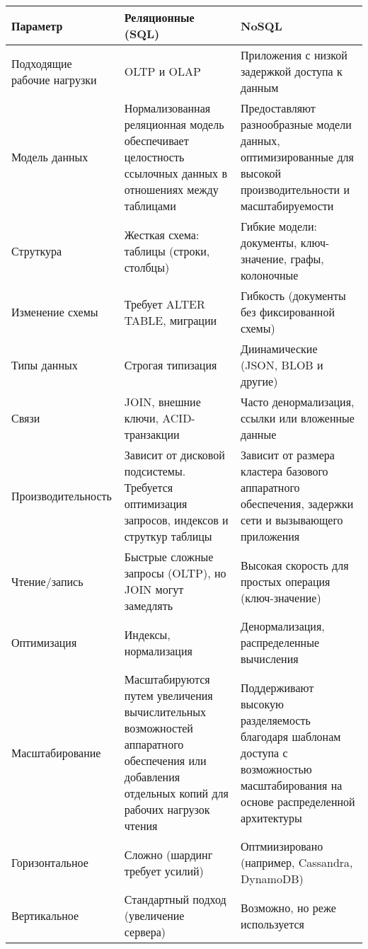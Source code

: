 \documentclass[12pt]{article}
\begin{document}
\begin{center}
    \begin{tabular}{|m{7.5em}|m{16em}|m{16em}|}
        \hline
        Параметр & Реляционные (SQL) & NoSQL \\
        \hline
        Подходящие рабочие нагрузки & OLTP и OLAP & Приложения с низкой задержкой доступа к данным \\
        \hline
        Модель данных & Нормализованная реляционная модель обеспечивает целостность ссылочных данных в отношениях между таблицами & Предоставляют разнообразные модели данных, оптимизированные для высокой производительности и масштабируемости \\ 
        \hline
        Струткура & Жесткая схема: таблицы (строки, столбцы) & Гибкие модели: документы, ключ-значение, графы, колоночные \\
        \hline
        Изменение схемы & Требует ALTER TABLE, миграции & Гибкость (документы без фиксированной схемы) \\
        \hline
        Типы данных & Строгая типизация & Диинамические (JSON, BLOB и другие) \\
        \hline
        Связи & JOIN, внешние ключи, ACID-транзакции & Часто денормализация, ссылки или вложенные данные \\
        \hline
        Производительность & Зависит от дисковой подсистемы. Требуется оптимизация запросов, индексов и струткур таблицы & Зависит от размера кластера базового аппаратного обеспечения, задержки сети и вызывающего приложения \\ 
        \hline
        Чтение/запись & Быстрые сложные запросы (OLTP), но JOIN могут замедлять & Высокая скорость для простых операция (ключ-значение) \\
        \hline
        Оптимизация & Индексы, нормализация & Денормализация, распределенные вычисления \\
        \hline
        Масштабирование & Масштабируются путем увеличения вычислительных возможностей аппаратного обеспечения или добавления отдельных копий для рабочих нагрузок чтения & Поддерживают высокую разделяемость благодаря шаблонам доступа с возможностью масштабирования на основе распределенной архитектуры \\
        \hline
        Горизонтальное & Сложно (шардинг требует усилий) & Оптмиизировано (например, Cassandra, DynamoDB) \\
        \hline
        Вертикальное & Стандартный подход (увеличение сервера) & Возможно, но реже используется \\
        \hline
    \end{tabular}
\end{center}
\end{document}
